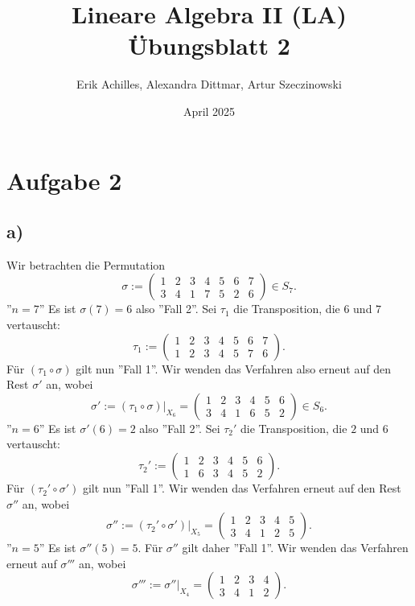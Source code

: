 \documentclass{article}
\title{Lineare Algebra II (LA) Übungsblatt 2}
\author{Erik Achilles, Alexandra Dittmar, Artur Szeczinowski}
\date{April 2025}
\begin{document}
\section*{Aufgabe 2}

\subsection*{a)}
Wir betrachten die Permutation
\[
  \sigma := \begin{pmatrix}
    1 & 2 & 3 & 4 & 5 & 6 & 7 \\
    3 & 4 & 1 & 7 & 5 & 2 & 6
  \end{pmatrix} \in S_7.
\]
''$n=7$''
Es ist
$\sigma(7) = 6$
also ''Fall 2''.
Sei
$\tau_1$
die Transposition,
die $6$ und $7$ vertauscht:
\[
  \tau_1 := \begin{pmatrix}
    1 & 2 & 3 & 4 & 5 & 6 & 7 \\
    1 & 2 & 3 & 4 & 5 & 7 & 6
  \end{pmatrix}.
\]
Für
$(\tau_1 \circ \sigma)$
gilt nun ''Fall 1''.
Wir wenden das Verfahren also erneut auf den Rest
$\sigma'$ an, wobei
\[
  \sigma' := (\tau_1 \circ \sigma)|_{X_6} = \begin{pmatrix}
    1 & 2 & 3 & 4 & 5 & 6 \\
    3 & 4 & 1 & 6 & 5 & 2
  \end{pmatrix} \in S_6.
\]
''$n=6$''
Es ist
$\sigma'(6) = 2$
also ''Fall 2''.
Sei
$\tau_2'$
die Transposition,
die $2$ und $6$ vertauscht:
\[
  \tau_2' := \begin{pmatrix}
    1 & 2 & 3 & 4 & 5 & 6 \\
    1 & 6 & 3 & 4 & 5 & 2
  \end{pmatrix}.
\]
Für
$(\tau_2' \circ \sigma')$
gilt nun ''Fall 1''.
Wir wenden das Verfahren erneut auf den Rest
$\sigma''$ an, wobei
\[
  \sigma'' := (\tau_2' \circ \sigma')|_{X_5} = \begin{pmatrix}
    1 & 2 & 3 & 4 & 5 \\
    3 & 4 & 1 & 2 & 5
  \end{pmatrix}.
\]
''$n=5$'' Es ist
$\sigma''(5) = 5$.
Für
$\sigma''$
gilt daher ''Fall 1''.
Wir wenden das Verfahren erneut auf $\sigma'''$ an, wobei
\[
  \sigma''' := \sigma''|_{X_4} = \begin{pmatrix}
    1 & 2 & 3 & 4 \\
    3 & 4 & 1 & 2
  \end{pmatrix}.
\]
\end{document}
